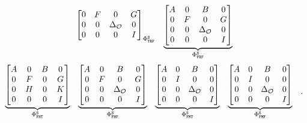 \begin{equation}
\begin{matrix}
{\begin{bmatrix}
                    0 & F & 0 & G \\
                    0 & 0 & \Delta_{\mathcal{O}}& 0 \\
                    0 & 0 & 0 & I
                \end{bmatrix}}_{\Phi_{\texttt{T}\texttt{R}\texttt{F}}^{\texttt{S}}} &
                \underbrace{\begin{bmatrix}
                    A & 0 & B & 0 \\
                    0 & F & 0 & G \\
                    0 & 0 & \Delta_{\mathcal{O}} & 0 \\
                    0 & 0 & 0 & I
                \end{bmatrix}}_{\Phi_{\texttt{F}\texttt{R}\texttt{F}}^{\texttt{S}}}
\end{matrix}
\end{equation}
\begin{equation*}
        \label{eq:cont-skip-2} 
            \begin{matrix}
                \underbrace{\begin{bmatrix}
                    A & 0 & B & 0 \\
                    0 & F & 0 & G \\
                    0 & H & 0 & K \\
                    0 & 0 & 0 & I
                \end{bmatrix}}_{\clmat_{\cF\cH\cT}^{\Skip}} &
                \underbrace{\begin{bmatrix}
                    A & 0 & B & 0 \\
                    0 & F & 0 & G \\
                    0 & 0 & \Delta_\actuator & 0 \\
                    0 & 0 & 0 & I
                \end{bmatrix}}_{\clmat_{\cF\cH\cF}^{\Skip}} &
                \underbrace{\begin{bmatrix}
                    A & 0 & B & 0 \\
                    0 & I & 0 & 0 \\
                    0 & 0 & \Delta_\actuator & 0 \\
                    0 & 0 & 0 & I
                \end{bmatrix}}_{\clmat_{\cF\cM\cT}^{\Skip}} &
                \underbrace{\begin{bmatrix}
                    A & 0 & B & 0 \\
                    0 & I & 0 & 0 \\
                    0 & 0 & \Delta_\actuator & 0 \\
                    0 & 0 & 0 & I
                \end{bmatrix}}_{\clmat_{\cF\cM\cF}^{\Skip}} &
            \end{matrix}.
    \end{equation*}
%
